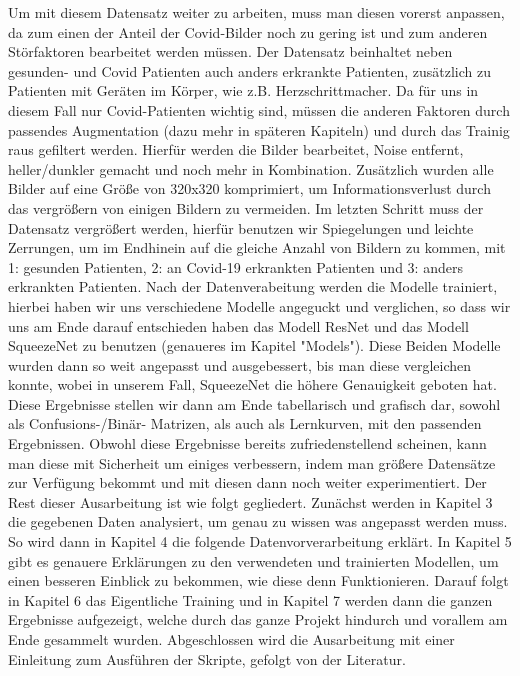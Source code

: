 \newline
Um mit diesem Datensatz weiter zu arbeiten, muss man diesen vorerst anpassen, da zum einen der Anteil der Covid-Bilder noch zu gering ist und zum anderen Störfaktoren bearbeitet werden müssen. Der Datensatz beinhaltet neben gesunden- und Covid Patienten auch anders erkrankte Patienten, zusätzlich zu Patienten mit Geräten im Körper, wie z.B. Herzschrittmacher. Da für uns in diesem Fall nur Covid-Patienten wichtig sind, müssen die anderen Faktoren durch passendes Augmentation (dazu mehr in späteren Kapiteln) und durch das Trainig raus gefiltert werden. Hierfür werden die Bilder bearbeitet, Noise entfernt, heller/dunkler gemacht und noch mehr in Kombination. Zusätzlich wurden alle Bilder auf eine Größe von 320x320 komprimiert, um Informationsverlust durch das vergrößern von einigen Bildern zu vermeiden. Im letzten Schritt muss der Datensatz vergrößert werden, hierfür benutzen wir Spiegelungen und leichte Zerrungen, um im Endhinein auf die gleiche Anzahl von Bildern zu kommen, mit 1: gesunden Patienten, 2: an Covid-19 erkrankten Patienten und 3: anders erkrankten Patienten.
\newline
Nach der Datenverabeitung werden die Modelle trainiert, hierbei haben wir uns verschiedene Modelle angeguckt und verglichen, so dass wir uns am Ende darauf entschieden haben das Modell ResNet und das Modell SqueezeNet zu benutzen (genaueres im Kapitel "Models"). Diese Beiden Modelle wurden dann so weit angepasst und ausgebessert, bis man diese vergleichen konnte, wobei in unserem Fall, SqueezeNet die höhere Genauigkeit geboten hat. Diese Ergebnisse stellen wir dann am Ende tabellarisch und grafisch dar, sowohl als Confusions-/Binär- Matrizen, als auch als Lernkurven, mit den passenden Ergebnissen.
\newline
Obwohl diese Ergebnisse bereits zufriedenstellend scheinen, kann man diese mit Sicherheit um einiges verbessern, indem man größere Datensätze zur Verfügung bekommt und mit diesen dann noch weiter experimentiert.
\newline
Der Rest dieser Ausarbeitung ist wie folgt gegliedert. Zunächst werden in Kapitel 3 die gegebenen Daten analysiert, um genau zu wissen was angepasst werden muss. So wird dann in Kapitel 4 die folgende Datenvorverarbeitung erklärt. In Kapitel 5 gibt es genauere Erklärungen zu den verwendeten und trainierten Modellen, um einen besseren Einblick zu bekommen, wie diese denn Funktionieren. Darauf folgt in Kapitel 6 das Eigentliche Training und in Kapitel 7 werden dann die ganzen Ergebnisse aufgezeigt, welche durch das ganze Projekt hindurch und vorallem am Ende gesammelt wurden. Abgeschlossen wird die Ausarbeitung mit einer Einleitung zum Ausführen der Skripte, gefolgt von der Literatur.
